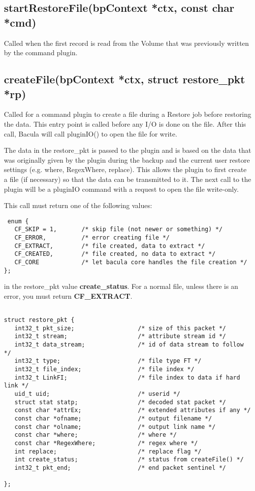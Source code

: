 \subsection{startRestoreFile(bpContext *ctx, const char *cmd)}
Called when the first record is read from the Volume that was
previously written by the command plugin.

\subsection{createFile(bpContext *ctx, struct restore\_pkt *rp)}
Called for a command plugin to create a file during a Restore job before
restoring the data.
This entry point is called before any I/O is done on the file.  After
this call, Bacula will call pluginIO() to open the file for write.

The data in the
restore\_pkt is passed to the plugin and is based on the data that was
originally given by the plugin during the backup and the current user
restore settings (e.g. where, RegexWhere, replace).  This allows the
plugin to first create a file (if necessary) so that the data can
be transmitted to it.  The next call to the plugin will be a
pluginIO command with a request to open the file write-only.

This call must return one of the following values:

\begin{verbatim}
 enum {
   CF_SKIP = 1,       /* skip file (not newer or something) */
   CF_ERROR,          /* error creating file */
   CF_EXTRACT,        /* file created, data to extract */
   CF_CREATED,        /* file created, no data to extract */
   CF_CORE            /* let bacula core handles the file creation */
};
\end{verbatim}

in the restore\_pkt value {\bf create\_status}.  For a normal file,
unless there is an error, you must return {\bf CF\_EXTRACT}.

\begin{verbatim}

struct restore_pkt {
   int32_t pkt_size;                  /* size of this packet */
   int32_t stream;                    /* attribute stream id */
   int32_t data_stream;               /* id of data stream to follow */
   int32_t type;                      /* file type FT */
   int32_t file_index;                /* file index */
   int32_t LinkFI;                    /* file index to data if hard link */
   uid_t uid;                         /* userid */
   struct stat statp;                 /* decoded stat packet */
   const char *attrEx;                /* extended attributes if any */
   const char *ofname;                /* output filename */
   const char *olname;                /* output link name */
   const char *where;                 /* where */
   const char *RegexWhere;            /* regex where */
   int replace;                       /* replace flag */
   int create_status;                 /* status from createFile() */
   int32_t pkt_end;                   /* end packet sentinel */

};
\end{verbatim}

